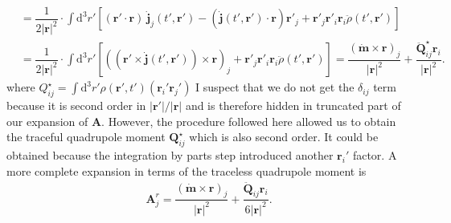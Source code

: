 \documentclass[10pt, a4paper]{article}
\begin{document}
{\begin{align*}
     &= \dfrac{1}{2|\mathbf{r}|^2} \cdot \int \text{d}^3r'  \left[ (\mathbf{r}' \cdot \mathbf{r})\  \dot{\mathbf{j}}_j(t', \mathbf{r}')-(\dot{\mathbf{j}}(t', \mathbf{r}') \cdot \mathbf{r})\mathbf{r}'_j + \mathbf{r}'_j \mathbf{r}'_i \mathbf{r}_i \ddot{\rho}(t', \mathbf{r}')\right]\\
     &= \dfrac{1}{2|\mathbf{r}|^2} \cdot \int \text{d}^3r'  \left[ ((\mathbf{r}' \times  \dot{\mathbf{j}}(t', \mathbf{r}')) \times \mathbf{r})_j + \mathbf{r}'_j \mathbf{r}'_i \mathbf{r}_i \ddot{\rho}(t', \mathbf{r}')\right]
     = \dfrac{(\dot{\mathbf{m}} \times \mathbf{r})_j}{|\mathbf{r}|^2} + \dfrac{\ddot{\mathbf{Q}}_{ij}^{\star} \mathbf{r}_i}{|\mathbf{r}|^2}.
\end{align*}
where ${Q}_{ij}^{\star} = \int \text{d}^3r' \rho(\mathbf{r}', t')(\mathbf{r}_i'\mathbf{r}_j')$
I suspect that we do not get the $\delta_{ij}$ term because it is second order in $|\mathbf{r}'|/|\mathbf{r}|$ and is therefore hidden in truncated part of our expansion of $\mathbf{A}$. However, the procedure followed here allowed us to obtain the traceful quadrupole moment $\mathbf{Q}_{ij}^{\star}$ which is also second order. It could be obtained because the integration by parts step introduced another $\mathbf{r}_i'$ factor. A more complete expansion in terms of the traceless quadrupole moment is 
\begin{align*}
    \mathbf{A}^r_j = \dfrac{(\dot{\mathbf{m}} \times \mathbf{r})_j}{|\mathbf{r}|^2} + \dfrac{\ddot{\mathbf{Q}}_{ij} \mathbf{r}_i}{6|\mathbf{r}|^2}. 
\end{align*}



}
\end{document}
